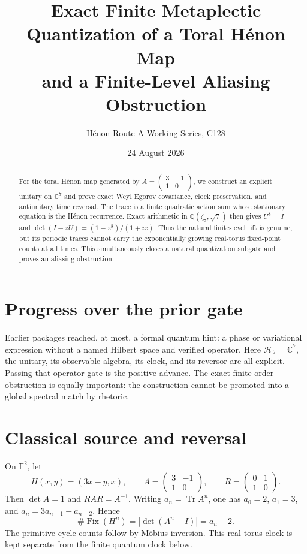 \documentclass[11pt]{article}
\title{Exact Finite Metaplectic Quantization of a Toral H\'enon Map\\
and a Finite-Level Aliasing Obstruction}
\author{H\'enon Route-A Working Series, C128}
\date{24 August 2026}
\newcommand{\Tr}{\operatorname{Tr}}
\begin{document}
\maketitle
\begin{abstract}
For the toral H\'enon map generated by
$A=\left(\begin{smallmatrix}3&-1\\1&0\end{smallmatrix}\right)$, we construct
an explicit unitary on $\mathbb C^7$ and prove exact Weyl Egorov covariance,
clock preservation, and antiunitary time reversal.  The trace is a finite
quadratic action sum whose stationary equation is the H\'enon recurrence.
Exact arithmetic in $\mathbb Q(\zeta_7,\sqrt7)$ then gives $U^8=I$ and
$\det(I-zU)=(1-z^8)/(1+iz)$.  Thus the natural finite-level lift is genuine,
but its periodic traces cannot carry the exponentially growing real-torus
fixed-point counts at all times.  This simultaneously closes a natural
quantization subgate and proves an aliasing obstruction.
\end{abstract}

\section{Progress over the prior gate}

Earlier packages reached, at most, a formal quantum hint: a phase or
variational expression without a named Hilbert space and verified operator.
Here $\mathcal H_7=\mathbb C^7$, the unitary, its observable algebra, its
clock, and its reversor are all explicit.  Passing that operator gate is the
positive advance.  The exact finite-order obstruction is equally important:
the construction cannot be promoted into a global spectral match by rhetoric.

\section{Classical source and reversal}

On $\mathbb T^2$, let
\[
 H(x,y)=(3x-y,x),\qquad
 A=\begin{pmatrix}3&-1\\1&0\end{pmatrix},\qquad
 R=\begin{pmatrix}0&1\\1&0\end{pmatrix}.
\]
Then $\det A=1$ and $RAR=A^{-1}$.  Writing $a_n=\Tr A^n$, one has
$a_0=2$, $a_1=3$, and $a_n=3a_{n-1}-a_{n-2}$.  Hence
\begin{equation}\label{eq:fix}
 \#\operatorname{Fix}(H^n)=|\det(A^n-I)|=a_n-2.
\end{equation}
The primitive-cycle counts follow by M\"obius inversion.  This real-torus
clock is kept separate from the finite quantum clock below.
\end{document}
